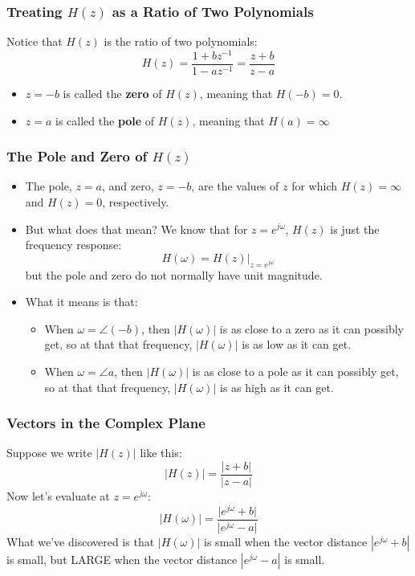 \documentclass{beamer}
\begin{document}
\begin{frame}
  \frametitle{Treating $H(z)$ as a Ratio of Two Polynomials}

  Notice that $H(z)$ is the ratio of two polynomials:
  \[
  H(z)=\frac{1+bz^{-1}}{1-az^{-1}}=\frac{z+b}{z-a}
  \]
  \begin{itemize}
  \item $z=-b$ is called the {\bf zero} of $H(z)$, meaning that $H(-b)=0$.
  \item $z=a$ is called the {\bf pole} of $H(z)$, meaning that $H(a)=\infty$
  \end{itemize}
\end{frame}

\begin{frame}
  \frametitle{The Pole and Zero of $H(z)$}

  \begin{itemize}
  \item The pole, $z=a$, and zero, $z=-b$, are the values of $z$ for which
    $H(z)=\infty$  and $H(z)=0$, respectively.
  \item But what does that mean?  We know that for $z=e^{j\omega}$,
    $H(z)$ is just the frequency response:
    \[
    H(\omega) = H(z)\vert_{z=e^{j\omega}}
    \]
    but the pole and zero do not normally have unit magnitude.
  \item What it means is that:
    \begin{itemize}
      \item When $\omega=\angle (-b)$, then
        $|H(\omega)|$ is as close to a zero as it can possibly get, so at that 
        that frequency, $|H(\omega)|$ is as low as it can get.
      \item When $\omega=\angle a$, then
        $|H(\omega)|$ is as close to a pole as it can possibly get, so at that 
        that frequency, $|H(\omega)|$ is as high as it can get.
    \end{itemize}
  \end{itemize}
\end{frame}

\begin{frame}
  \centerline{}
\end{frame}

\begin{frame}
  \centerline{}
\end{frame}

\begin{frame}
  \frametitle{Vectors in the Complex Plane}

  Suppose we write $|H(z)|$ like this:
  \[
  \vert H(z)\vert = \frac{\vert z+b\vert}{\vert z-a\vert}
  \]
  Now let's evaluate at $z=e^{j\omega}$:
  \[
  \vert H(\omega)\vert = 
  \frac{\vert e^{j\omega}+b\vert}{\vert e^{j\omega}-a\vert}
  \]
  What we've discovered is that $|H(\omega)|$ is small when the vector
  distance $|e^{j\omega}+b|$ is small, but LARGE when the vector
  distance $|e^{j\omega}-a|$ is small.
\end{frame}
\end{document}
